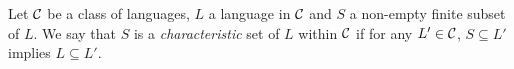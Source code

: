 

\begin{dfn}
    Let $\mathcal{C}$ be a class of languages, $L$ a language in $\mathcal{C}$ and
    $S$ a non-empty finite subset of $L$.
    We say that $S$ is a \textit{characteristic} set of $L$ within $\mathcal{C}$
    if for any $L' \in \mathcal{C}$,
    $S \subseteq L'$ implies $L \subseteq L'$.
\end{dfn}

